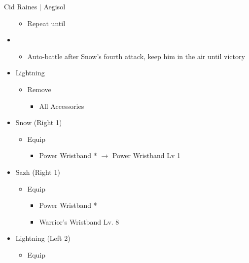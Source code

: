 \documentclass{report}
\begin{document}
\begin{battle}{Cid Raines $|$ Aegisol}
\begin{multicols}{2}
\begin{itemize}
    \begin{itemize}
        \item Repeat until \stagger
    \end{itemize}
    \item \sixth
    \begin{itemize}
        \item Auto-battle after Snow's fourth attack, keep him in the air until victory
    \end{itemize}
\end{itemize}
\end{multicols}
\end{battle}

\begin{menu}
\begin{itemize}
    \equip
    \begin{itemize}
        \item Lightning
        \begin{itemize}
            \item Remove
            \begin{itemize}
                \item All Accessories
            \end{itemize}
        \end{itemize}
        \item Snow (Right 1)
        \begin{itemize}
            \item Equip
            \begin{itemize}
                \item Power Wristband * $\rightarrow$ Power Wristband Lv 1
            \end{itemize}
        \end{itemize}
        \item Sazh (Right 1)
        \begin{itemize}
            \item Equip
            \begin{itemize}
                \item Power Wristband *
                \item Warrior's Wristband Lv. 8
            \end{itemize}
        \end{itemize}
        \item Lightning (Left 2)
        \begin{itemize}
            \item Equip

\end{itemize}
\end{itemize}
\end{itemize}
\end{menu}
\end{document}

